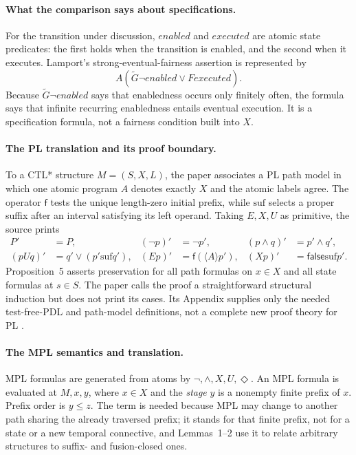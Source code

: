 \paragraph{What the comparison says about specifications.}
For the transition under discussion, \(\mathit{enabled}\) and
\(\mathit{executed}\) are atomic state predicates: the first holds when the
transition is enabled, and the second when it executes.  Lamport's
strong-eventual-fairness assertion is represented by
\[
 A(\widetilde G\neg\mathit{enabled}\lor F\mathit{executed}).
\]
Because \(\widetilde G\neg\mathit{enabled}\) says that enabledness occurs only
finitely often, the formula says that infinite recurring enabledness entails
eventual execution.  It is a specification formula, not a fairness condition
built into \(X\).

\paragraph{The PL translation and its proof boundary.}
To a CTL* structure \(M=(S,X,L)\), the paper associates a PL path model in
which one atomic program \(A\) denotes exactly \(X\) and the atomic labels
agree.  The operator \(\mathsf f\) tests the unique length-zero initial prefix,
while \(\mathrm{suf}\) selects a proper suffix after an interval satisfying
its left operand.  Taking \(E,X,U\) as primitive, the source prints
\[
\begin{aligned}
 P'&=P,
 &( \neg p)'&=\neg p',
 &(p\land q)'&=p'\land q',\\
 (pUq)'&=q'\lor(p'\mathbin{\mathrm{suf}}q'),
 &(Ep)'&=\mathsf f(\langle A\rangle p'),
 &(Xp)'&=\mathsf{false}\mathbin{\mathrm{suf}}p'.
\end{aligned}
\]
Proposition~5 asserts preservation for all path formulas on
\(x\in X\) and all state formulas at \(s\in S\).  The paper calls the proof
a straightforward structural induction but does not print its cases.  Its
Appendix supplies only the needed test-free-PDL and path-model definitions,
not a complete new proof theory for PL
\cite[pp.~164, 175--176]{EmersonHalpern1986}.

\paragraph{The MPL semantics and translation.}
\label{sec:p09-mpl-translation}
MPL formulas are generated from atoms by \(\neg,\land,X,U,\Diamond\).
An MPL formula is evaluated at \(M,x,y\), where \(x\in X\) and the
\emph{stage} \(y\) is a nonempty finite prefix of \(x\).  Prefix order is
\(y\leq z\).  The term is needed because MPL may change to another path
sharing the already traversed prefix; it stands for that finite prefix, not
for a state or a new temporal connective, and Lemmas~1--2 use it to relate
arbitrary structures to suffix- and fusion-closed ones.

